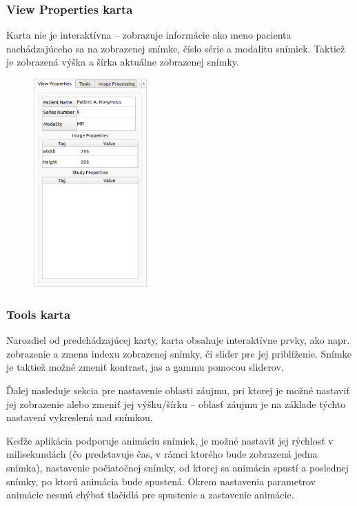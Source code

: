 {\subsubsection {View Properties karta}
Karta  nie je interaktívna -- zobrazuje informácie ako meno pacienta nachádzajúceho sa na zobrazenej snímke, číslo série a modalitu snímiek. Taktiež je zobrazená výška a šírka aktuálne zobrazenej snímky.

\begin {figure}[H]
        \centering
        \includegraphics[height=8cm]{media/existing_app/tabs/view_properties.png}
        \captionsetup{justification=centering}
\end {figure}

\clearpage

\subsubsection {Tools karta}
Narozdiel od predchádzajúcej karty,  karta obsahuje interaktívne prvky, ako napr. zobrazenie a zmena indexu zobrazenej snímky, či slider pre jej priblíženie. Snímke je taktiež možné zmeniť kontrast, jas a gammu pomocou sliderov.

Ďalej nasleduje sekcia pre nastavenie oblasti záujmu, pri ktorej je možné nastaviť jej zobrazenie alebo zmeniť jej výšku/šírku -- oblasť záujmu je na základe týchto nastavení vykreslená nad snímkou. 

Keďže aplikácia podporuje animáciu snímiek, je možné nastaviť jej rýchlosť v milisekundách (čo predstavuje čas, v rámci ktorého bude zobrazená jedna snímka), nastavenie počiatočnej snímky, od ktorej sa animácia spustí a poslednej snímky, po ktorú animácia bude spustená. Okrem nastavenia parametrov animácie nesmú chýbať tlačidlá pre spustenie a zastavenie animácie.

}
